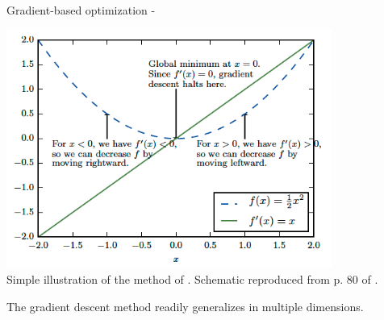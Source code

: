 \begin{frame}[t,allowframebreaks]{Gradient-based optimization -}

    \vspace{-1.0cm}

    \begin{center}
        \includegraphics[width=0.80\textwidth]
            {./images/grad_descent/goodfellow17_grad_descent_1d.png}\\
        {\tiny 
            Simple illustration of the method of
            .
            \color{col:attribution} 
            Schematic reproduced from p. 80 of \cite{Goodfellow:2017MITDL}.\\
        }
    \end{center}        

    \framebreak


    The \gls{gradient descent} method
    readily generalizes in multiple dimensions.\\



\end{frame}
